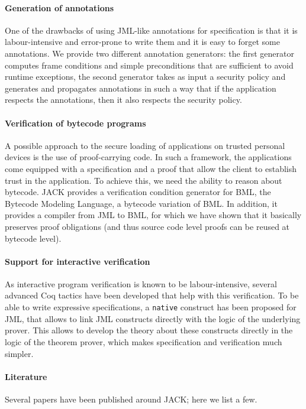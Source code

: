 \documentclass[]{llncs}
\begin{document}
\paragraph{Generation of annotations}
One of the drawbacks of using JML-like annotations for specification
is that it is labour-intensive and error-prone to write them and it is
easy to forget some annotations. We provide two different annotation
generators: the first generator computes frame conditions and simple
preconditions that are sufficient to avoid runtime exceptions, the
second generator takes as input a security policy and generates and
propagates annotations in such a way that if the application respects
the annotations, then it also respects the security policy.

\paragraph{Verification of bytecode programs}
A possible approach to the secure loading of applications on trusted
personal devices is the use of proof-carrying code. In such a
framework, the applications come equipped with a specification and a
proof that allow the client to establish trust in the application. To
achieve this, we need the ability to reason about bytecode. JACK
provides a verification condition generator for BML, the Bytecode
Modeling Language, a bytecode variation of BML. In addition, it
provides a compiler from JML to BML, for which we have shown that it
basically preserves proof obligations (and thus source code level
proofs can be reused at bytecode level).

\paragraph{Support for interactive verification}
As interactive program verification is known to be labour-intensive,
several advanced Coq tactics have been developed that help with this
verification. To be able to write expressive specifications, a
\texttt{native} construct has been proposed for JML, that allows to
link JML constructs directly with the logic of the underlying
prover. This allows to develop the theory about these constructs
directly in the logic of the theorem prover, which makes specification
and verification much simpler.

\paragraph{Literature}
Several papers have been published around JACK; here we list a few.

\nocite{BRL03:fme,Charles06,m+04:cardis,BurdyP06}



\end{document}
